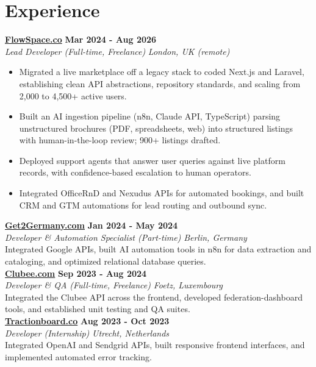 \documentclass[a4paper,10pt]{article}
\newcommand{\role}[4]{%
 \textbf{#1} \hfill \textbf{#2}\\[1pt]%
 \textit{#3} \hfill \textit{#4}\\[2pt]%
}
\begin{document}
\section{Experience}

\role{\href{https://flowspace.co}{FlowSpace.co}}{Mar 2024 - Aug 2026}{Lead Developer (Full-time, Freelance)}{London, UK (remote)}
\begin{itemize}
 \item Migrated a live marketplace off a legacy stack to coded Next.js and Laravel, establishing clean API abstractions, repository standards, and scaling from 2,000 to 4,500+ active users.
 \item Built an AI ingestion pipeline (n8n, Claude API, TypeScript) parsing unstructured brochures (PDF, spreadsheets, web) into structured listings with human-in-the-loop review; 900+ listings drafted.
 \item Deployed support agents that answer user queries against live platform records, with confidence-based escalation to human operators.
 \item Integrated OfficeRnD and Nexudus APIs for automated bookings, and built CRM and GTM automations for lead routing and outbound sync.
\end{itemize}

\role{\href{https://get2germany.com}{Get2Germany.com}}{Jan 2024 - May 2024}{Developer \& Automation Specialist (Part-time)}{Berlin, Germany}
Integrated Google APIs, built AI automation tools in n8n for data extraction and cataloging, and optimized relational database queries.\\[1pt]

\role{\href{https://clubee.com}{Clubee.com}}{Sep 2023 - Aug 2024}{Developer \& QA (Full-time, Freelance)}{Foetz, Luxembourg}
Integrated the Clubee API across the frontend, developed federation-dashboard tools, and established unit testing and QA suites.\\[1pt]

\role{\href{https://tractionboard.co}{Tractionboard.co}}{Aug 2023 - Oct 2023}{Developer (Internship)}{Utrecht, Netherlands}
Integrated OpenAI and Sendgrid APIs, built responsive frontend interfaces, and implemented automated error tracking.

\end{document}
